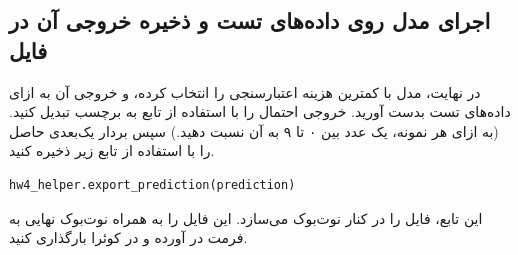 \documentclass{article}
\begin{document}
\subsection*{اجرای مدل روی داده‌های تست و ذخیره خروجی آن در فایل}

در نهایت، مدل با کمترین هزینه اعتبارسنجی را انتخاب کرده، و خروجی آن به ازای داده‌های تست بدست آورید. خروجی احتمال را با استفاده از تابع
به برچسب تبدیل کنید. (به ازای هر نمونه،‌ یک عدد بین ۰ تا ۹ به آن نسبت دهید.) سپس بردار یک‌بعدی حاصل را با استفاده از تابع زیر ذخیره کنید.

\begin{latin}
\begin{lstlisting}[language=Python]
hw4_helper.export_prediction(prediction)
\end{lstlisting}
\end{latin}

این تابع، فایل 
را در کنار نوت‌بوک می‌سازد. این فایل را به همراه نوت‌بوک نهایی به فرمت
در آورده و در کوئرا بارگذاری کنید.
\end{document}
